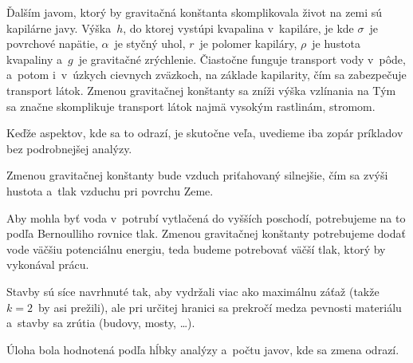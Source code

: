 {Ďalším javom, ktorý by gravitačná konštanta skomplikovala život na zemi sú kapilárne
javy. Výška~$h$, do ktorej vystúpi kvapalina v~kapiláre, je
kde $\sigma$~je povrchové napätie, $\alpha$~je styčný uhol, $r$~je polomer kapiláry,
$\rho$~je hustota kvapaliny a~$g$~je gravitačné zrýchlenie. Čiastočne funguje transport
vody v~pôde, a~potom i~v~úzkych cievnych zväzkoch, na základe kapilarity, čím sa
zabezpečuje transport látok. Zmenou gravitačnej konštanty sa zníži výška vzlínania na
Tým sa značne skomplikuje transport látok najmä vysokým rastlinám, stromom.

Keďže aspektov, kde sa to odrazí, je skutočne veľa, uvedieme iba zopár príkladov bez
podrobnejšej analýzy.
\begin{compactitem}
\item Zmenou gravitačnej konštanty bude vzduch priťahovaný silnejšie, čím sa zvýši
hustota a~tlak vzduchu pri povrchu Zeme.
\item Aby mohla byť voda v~potrubí vytlačená do vyšších poschodí, potrebujeme na
to podľa Bernoulliho rovnice tlak. Zmenou gravitačnej konštanty potrebujeme dodať
vode väčšiu potenciálnu energiu, teda budeme potrebovať väčší tlak, ktorý by
vykonával prácu.
\item Stavby sú síce navrhnuté tak, aby vydržali viac ako maximálnu záťaž (takže
$k=2$~by asi prežili), ale pri určitej hranici sa prekročí medza pevnosti materiálu
a~stavby sa zrútia (budovy, mosty, \dots).
\end{compactitem}

\ifyearbook \else
Úloha bola hodnotená podľa hĺbky analýzy a~počtu javov, kde sa zmena odrazí.\fi}
